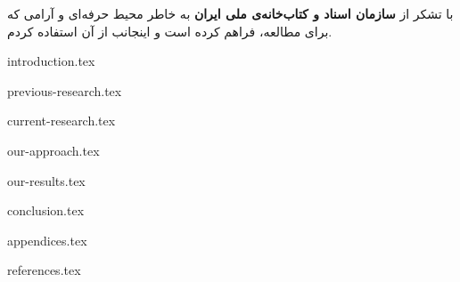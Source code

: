 \documentclass[a4paper,11px]{article}
\begin{document}
\vspace{10mm}
با تشکر از 
\textbf{
سازمان اسناد و کتاب‌خانه‌ی ملی ایران
} 
به خاطر محیط حرفه‌ای و آرامی که برای مطالعه، فراهم کرده است و اینجانب از آن استفاده کردم.

\newpage


\setcounter{secnumdepth}{2}
\setcounter{tocdepth}{2}
\tableofcontents

\newpage


\listoffigures

\newpage
 
 
\listoftables

\newpage

{introduction.tex}

\newpage


{previous-research.tex}

\newpage


{current-research.tex}

\newpage


{our-approach.tex}

\newpage



{our-results.tex}

\newpage



{conclusion.tex}

\newpage



{appendices.tex}

\newpage




{references.tex}
\end{document}
